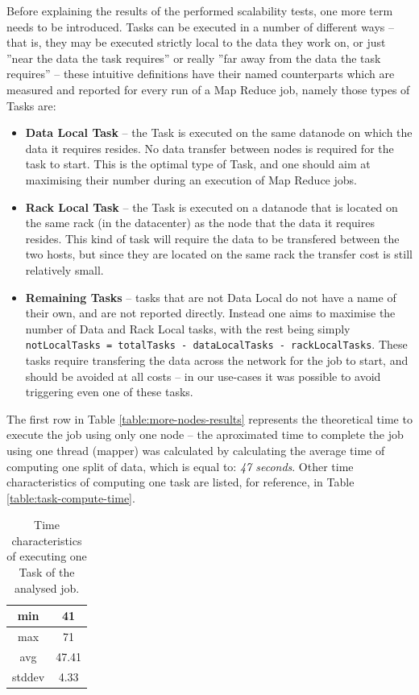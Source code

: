 Before explaining the results of the performed scalability tests, one more term needs to be introduced. Tasks can be executed in a number of different ways -- that is, they may be executed strictly local to the data they work on, or just ''near the data the task requires'' or really ''far away from the data the task requires'' -- these intuitive definitions have their named counterparts which are measured and reported for every run of a Map Reduce job, namely those types of Tasks are:

\begin{itemize}
  \item \textbf{Data Local Task} -- the Task is executed on the same datanode on which the data it requires resides. No data transfer between nodes is required for the task to start. This is the optimal type of Task, and one should aim at maximising their number during an execution of Map Reduce jobs.
  \item \textbf{Rack Local Task} -- the Task is executed on a datanode that is located on the same rack (in the datacenter) as the node that the data it requires resides. This kind of task will require the data to be transfered between the two hosts, but since they are located on the same rack the transfer cost is still relatively small.
  \item \textbf{Remaining Tasks} -- tasks that are not Data Local do not have a name of their own, and are not reported directly. Instead one aims to maximise the number of Data and Rack Local tasks, with the rest being simply \verb|notLocalTasks = totalTasks - dataLocalTasks - rackLocalTasks|. These tasks require transfering the data across the network for the job to start, and should be avoided at all costs -- in our use-cases it was possible to avoid triggering even one of these tasks.
\end{itemize}

The first row in Table \ref{table:more-nodes-results} represents the theoretical time to execute the job using only one node -- the aproximated time to complete the job using one thread (mapper) was calculated by calculating the average time of computing one split of data, which is equal to: \textit{47 seconds}. Other time characteristics of computing one task are listed, for reference, in Table \ref{table:task-compute-time}.

\begin{table}[hbt]
  \centering
  \begin{tabular}{|c|c|}
  \hline
    min    &   41     \\ \hline
    max    &   71     \\ \hline
    avg	&   47.41  \\ \hline
    stddev &   4.33   \\ \hline
  \end{tabular}
  \label{table:time-task}
  \caption{Time characteristics of executing one Task of the analysed job.}
\end{table}


